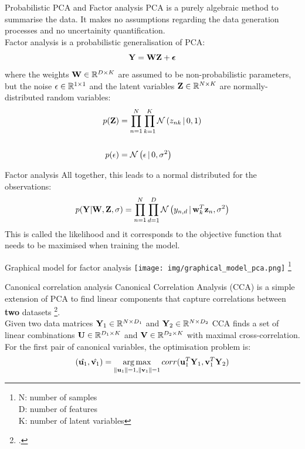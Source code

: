 \documentclass[aspectratio=169,notes]{beamer}
\newcommand\blfootnote[1]{%
  \begingroup
  \renewcommand\thefootnote{}\footnote{#1}%
  \addtocounter{footnote}{-1}%
  \endgroup
}
\begin{document}
	\begin{frame}{Probabilistic PCA and Factor analysis}
	PCA is a purely algebraic method to summarise the data. It makes no assumptions regarding the data generation processes and no uncertainity quantification.\\
	Factor analysis is a probabilistic generalisation of PCA:
	\[
		{\bf Y} = {\bf W} {\bf Z} + \mbox{\boldmath $\epsilon$}
	\]
	where the weights ${\bf W} \in \mathbb{R}^{D \times K}$ are assumed to be non-probabilistic parameters, but the noise $\epsilon \in \mathbb{R}^{1 \times 1}$ and the latent variables ${\bf Z} \in \mathbb{R}^{N \times K}$ are normally-distributed random variables:
	\begin{align*}
		p({\bf Z}) &= \prod_{n=1}^{N} \prod_{k=1}^{K} \mathcal{N}\left(z_{nk} \,|\, 0,1\right) \\
		\\
		p(\epsilon) &= \mathcal{N}\left(\epsilon \,|\, 0,\sigma^{2}\right)
	\end{align*}
	\end{frame}

	\begin{frame}{Factor analysis}
	All together, this leads to a normal distributed for the observations:
	\[
		p({\bf Y}|{\bf W},{\bf Z},\sigma) = \prod_{n=1}^{N} \prod_{d=1}^{D} \mathcal{N}\left(y_{n,d} \,|\, {\bf w}_{k}^T {\bf z}_{n},\sigma^2\right)
	\]
	This is called the likelihood and it corresponds to the objective function that needs to be maximised when training the model.
	\end{frame}

	\begin{frame}{Graphical model for factor analysis}
	\centering
	\texttt{[image: img/graphical\_model\_pca.png]}
	\blfootnote{N: number of samples\\D: number of features\\K: number of latent variables}
	\end{frame}


	\begin{frame}{Canonical correlation analysis}
	Canonical Correlation Analysis (CCA) is a simple extension of PCA to find linear components that capture correlations between \textbf{two} datasets \footcite{Hotteling1936}.\\
	\leavevmode\newline
	Given two data matrices ${\bf Y}_1 \in \mathbb{R}^{N \times D_1}$ and ${\bf Y}_2 \in \mathbb{R}^{N \times D_2}$ CCA finds a set of linear combinations ${\bf U} \in \mathbb{R}^{D_1 \times K}$ and ${\bf V} \in \mathbb{R}^{D_2 \times K}$ with maximal cross-correlation.\\ 
	\leavevmode\newline
	For the first pair of canonical variables, the optimisation problem is:
	\[
		(\hat{{\bf u}_1}, \hat{{\bf v}_1}) = \operatorname*{arg\,max}_{\|{\bf u}_1\|=1,\|{\bf v}_1\|=1} corr({\bf u}_{1}^T {\bf Y}_1, {\bf v}_{1}^T {\bf Y}_2)
	\]
	\end{frame}
\end{document}
